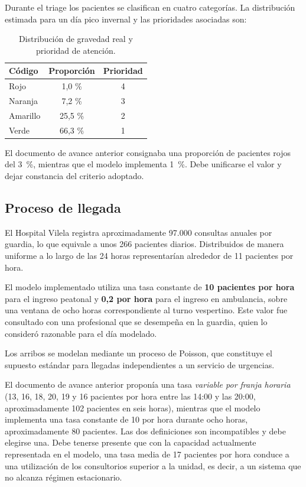 Durante el triage los pacientes se clasifican en cuatro categorías. La
distribución estimada para un día pico invernal y las prioridades asociadas
son:

\begin{table}[H]
\centering
\begin{tabular}{lcc}
\toprule
\textbf{Código} & \textbf{Proporción} & \textbf{Prioridad} \\
\midrule
Rojo     & 1,0 \%  & 4 \\
Naranja  & 7,2 \%  & 3 \\
Amarillo & 25,5 \% & 2 \\
Verde    & 66,3 \% & 1 \\
\bottomrule
\end{tabular}
\caption{Distribución de gravedad real y prioridad de atención.}
\label{tab:colores}
\end{table}

\begin{pendiente}
El documento de avance anterior consignaba una proporción de pacientes rojos
del 3~\%, mientras que el modelo implementa 1~\%. Debe unificarse el valor y
dejar constancia del criterio adoptado.
\end{pendiente}

\subsection{Proceso de llegada}
\label{sec:arribos}

El Hospital Vilela registra aproximadamente 97.000 consultas anuales por
guardia, lo que equivale a unos 266 pacientes diarios. Distribuidos de manera
uniforme a lo largo de las 24 horas representarían alrededor de 11 pacientes
por hora.

El modelo implementado utiliza una tasa constante de \textbf{10 pacientes por
hora} para el ingreso peatonal y \textbf{0,2 por hora} para el ingreso en
ambulancia, sobre una ventana de ocho horas correspondiente al turno
vespertino. Este valor fue consultado con una profesional que se desempeña en
la guardia, quien lo consideró razonable para el día modelado.

Los arribos se modelan mediante un proceso de Poisson, que constituye el
supuesto estándar para llegadas independientes a un servicio de urgencias.

\begin{pendiente}
El documento de avance anterior proponía una tasa \emph{variable por franja
horaria} (13, 16, 18, 20, 19 y 16 pacientes por hora entre las 14:00 y las
20:00, aproximadamente 102 pacientes en seis horas), mientras que el modelo
implementa una tasa constante de 10 por hora durante ocho horas,
aproximadamente 80 pacientes. Las dos definiciones son incompatibles y debe
elegirse una. Debe tenerse presente que con la capacidad actualmente
representada en el modelo, una tasa media de 17 pacientes por hora conduce a
una utilización de los consultorios superior a la unidad, es decir, a un
sistema que no alcanza régimen estacionario.
\end{pendiente}

